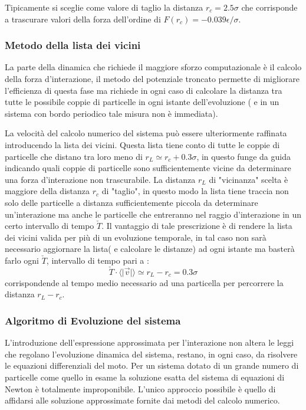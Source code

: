 Tipicamente si sceglie come valore di taglio la distanza $r_c = 2.5 \sigma$ che corrisponde a trascurare valori della forza dell'ordine di $F(r_c) = -0.039 \epsilon / \sigma$.

\FloatBarrier 
\subsubsection{Metodo della lista dei vicini}
La parte della dinamica che richiede il maggiore sforzo computazionale è il calcolo della forza d'interazione, il metodo del potenziale troncato permette di migliorare l'efficienza di questa fase ma richiede in ogni caso di calcolare la distanza tra tutte le possibile coppie di particelle in ogni istante dell'evoluzione ( e in un sistema con bordo periodico tale misura non è immediata).

La velocità del calcolo numerico del sistema può essere ulteriormente raffinata introducendo la lista dei vicini.
Questa lista tiene conto di tutte le coppie di particelle che distano tra loro meno di $r_L \simeq r_c +0.3\sigma$, in questo funge da guida indicando quali coppie di particelle sono sufficientemente vicine da determinare una forza d'interazione non trascurabile.\newline
La distanza $r_L$ di "vicinanza" scelta è maggiore della distanza $r_c$ di "taglio", in questo modo la lista tiene traccia non solo delle particelle a distanza sufficientemente piccola da determinare un'interazione ma anche le particelle che entreranno nel raggio d'interazione in un certo intervallo di tempo $\check{T}$. \newline
Il vantaggio di tale prescrizione è di rendere la lista dei vicini valida per più di un evoluzione temporale, in tal caso non sarà necessario aggiornare la lista( e calcolare le distanze) ad ogni istante ma basterà farlo ogni $\check{T}$, intervallo di tempo pari a :
\begin{displaymath}
\check{T} \cdot \langle \vert \vec{v} \vert \rangle \simeq r_L - r_c = 0.3 \sigma
\end{displaymath}
corrispondende al tempo medio necessario ad una particella per percorrere la distanza $r_L - r_c$.

\FloatBarrier 
\subsubsection{Algoritmo di Evoluzione del sistema}
L'introduzione dell'espressione approssimata per l'interazione non altera le leggi che regolano l'evoluzione dinamica del sistema, restano, in ogni caso, da risolvere le equazioni differenziali del moto.
Per un sistema dotato di un grande numero di particelle come quello in esame la soluzione esatta del sistema di equazioni di Newton è totalmente improponibile.
L'unico approccio possibile è quello di affidarsi alle soluzione approssimate fornite dai metodi del calcolo numerico.

